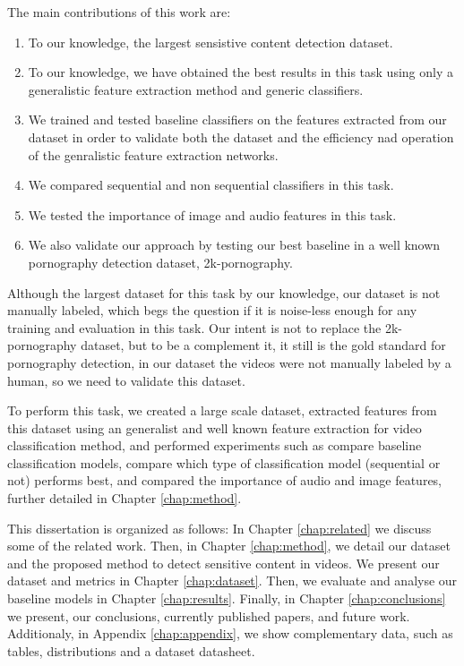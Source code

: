 The main contributions of this work are:
\begin{enumerate}
    \item To our knowledge, the largest sensistive content detection dataset.
    \item To our knowledge, we have obtained the best results in this task using only a generalistic feature extraction method and generic classifiers.
    \item We trained and tested baseline classifiers on the features extracted from our dataset in order to validate both the dataset and the efficiency nad operation of the genralistic feature extraction networks.  
    \item We compared sequential and non sequential classifiers in this task.
    \item We tested the importance of image and audio features in this task.
    \item We also validate our approach by testing our best baseline in a well known pornography detection dataset, 2k-pornography. 
\end{enumerate}
Although the largest dataset for this task by our knowledge, our dataset is not manually labeled, which begs the question if it is noise-less enough for any training and evaluation in this task.  
Our intent is not to replace the 2k-pornography dataset, but to be a complement it, it still is the gold standard for pornography detection, in our dataset the videos were not manually labeled by a human, so we need to validate this dataset.

To perform this task, we created a large scale dataset, extracted features from this dataset using an generalist and well known feature extraction for video classification method, and performed experiments such as compare baseline classification models, compare which type of classification model (sequential or not) performs best, and compared the importance of audio and image features, further detailed in Chapter \ref{chap:method}.

This dissertation is organized as follows:
In Chapter \ref{chap:related} we discuss some of the related work.
Then, in Chapter \ref{chap:method}, we detail our dataset and the proposed method to detect sensitive content in videos.
We present our dataset and metrics in Chapter \ref{chap:dataset}.
Then, we evaluate and analyse our baseline models in Chapter \ref{chap:results}.
Finally, in Chapter \ref{chap:conclusions} we present, our conclusions, currently published papers, and future work.
Additionaly, in Appendix \ref{chap:appendix}, we show complementary data, such as tables, distributions and a dataset datasheet.